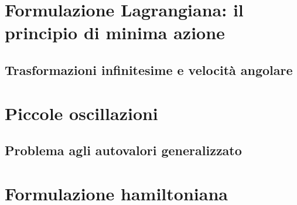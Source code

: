 \documentclass[
10pt, %
a4paper, %
oneside, %
headinclude,footinclude, %
BCOR5mm, %
]{scrartcl}
\begin{document}
\section{Formulazione Lagrangiana: il principio di minima azione}
\subsection{Trasformazioni infinitesime e velocità angolare}\label{ap:rotazioni}

\newpage
\section{Piccole oscillazioni}
\subsection{Problema agli autovalori generalizzato}\label{ap:autoval}

\newpage
\section{Formulazione hamiltoniana}
\end{document}
